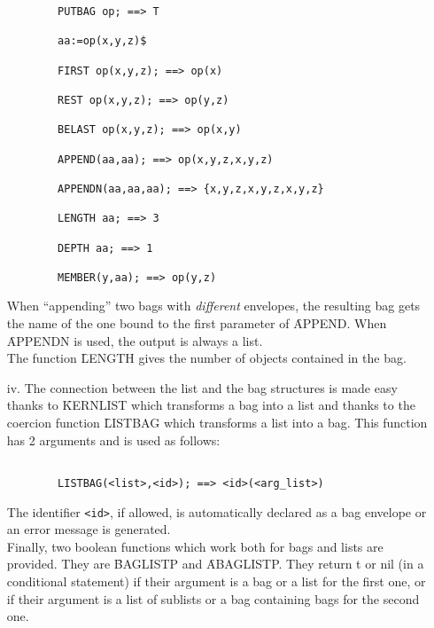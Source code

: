 \begin{itemize}
\begin{verbatim}
        PUTBAG op; ==> T

        aa:=op(x,y,z)$

        FIRST op(x,y,z); ==> op(x)

        REST op(x,y,z); ==> op(y,z)

        BELAST op(x,y,z); ==> op(x,y)

        APPEND(aa,aa); ==> op(x,y,z,x,y,z)

        APPENDN(aa,aa,aa); ==> {x,y,z,x,y,z,x,y,z}

        LENGTH aa; ==> 3

        DEPTH aa; ==> 1

        MEMBER(y,aa); ==> op(y,z)

\end{verbatim}
When ``appending'' two bags with {\em different} envelopes, the resulting bag
gets the name of the one bound to the first parameter of \f{APPEND}. When  
\f{APPENDN} is used, the output is always a list.\\
The function \f{LENGTH} gives the number of objects contained in the 
bag.
\item[iv.]
The connection between the list and the bag structures is made easy
thanks to \f{KERNLIST} which transforms a bag into a list and thanks to
the coercion function \f{LISTBAG} which transforms a list into a bag. 
This function has 2 arguments
and is used as follows:
\begin{verbatim}

        LISTBAG(<list>,<id>); ==> <id>(<arg_list>)

\end{verbatim}
The identifier \verb+<id>+, if allowed, is automatically declared as a bag
envelope or an error message is generated. \\[3pt]
Finally, two boolean functions which work both for bags and lists are
provided. They are \f{BAGLISTP} and \f{ABAGLISTP}.
They return t or nil (in a conditional statement) if their argument
is a bag or a list for the first one, or if their argument is a list of
sublists or a bag containing bags for the second one.
\end{itemize}
